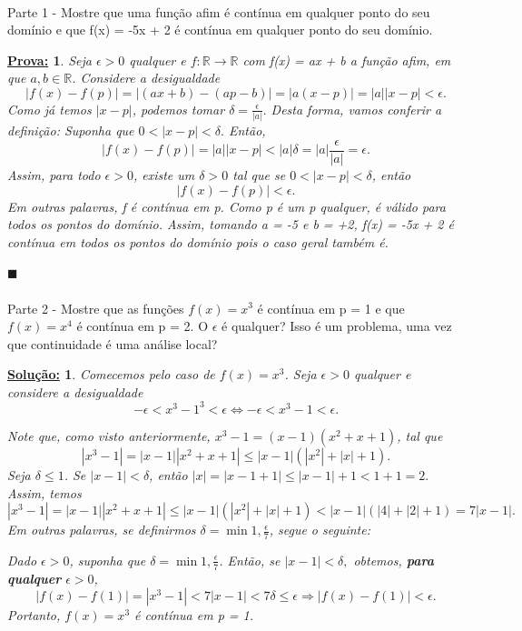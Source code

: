 \documentclass{article}
\newtheorem*{sol*}{\underline{Solu\c c\~ao:}}
\newtheorem*{proof*}{\underline{Prova:}}
\renewcommand\qedsymbol{$\blacksquare$}
\begin{document}
\paragraph{} Parte 1 - Mostre que uma fun\c c\~ao afim \'e cont\'inua em qualquer ponto do seu dom\'inio e que f(x) = -5x + 2 \'e cont\'inua em qualquer ponto do seu dom\'inio.
\begin{proof*}
Seja $\epsilon > 0$ qualquer e $f:\mathbb{R}\rightarrow\mathbb{R}$ com f(x) = ax + b a fun\c c\~ao afim, em que $a, b\in\mathbb{R}$. Considere a desigualdade 
$$
|f(x) - f(p)| = |(ax + b) - (ap - b)| = |a(x - p)| = |a||x - p|< \epsilon.
$$
Como j\'a temos $|x - p|$, podemos tomar $\delta = \frac{\epsilon}{|a|}.$ Desta forma, vamos conferir a defini\c c\~ao: Suponha que $0 < |x - p| < \delta.$ Ent\~ao, 
$$
|f(x) - f(p)| = |a||x - p| < |a|\delta = |a|\frac{\epsilon}{|a|} = \epsilon.
$$
Assim, para todo $\epsilon > 0$, existe um $\delta > 0$ tal que se $0 < |x - p| < \delta$, ent\~ao
$$
|f(x) - f(p)| < \epsilon.
$$
Em outras palavras, f \'e cont\'inua em p. Como p \'e um p qualquer, \'e v\'alido para todos os pontos do dom\'inio. Assim, tomando a = -5 e b = +2, f(x) = -5x + 2 \'e cont\'inua em todos os pontos do dom\'inio pois o caso geral tamb\'em \'e.

\qedsymbol
\end{proof*}

\paragraph{} Parte 2 - Mostre que as fun\c c\~oes $f(x) = x^3$ \'e cont\'inua em p = 1 e que $f(x) = x^4$ \'e cont\'inua em p = 2. O $\epsilon$ \'e qualquer? Isso \'e um problema, uma vez que continuidade \'e uma an\'alise local?
\begin{sol*}
Comecemos pelo caso de $f(x) = x^3$. Seja $\epsilon > 0$ qualquer e considere a desigualdade
$$
-\epsilon < x^3 - 1^3 < \epsilon \Leftrightarrow -\epsilon < x^3 - 1 < \epsilon.
$$

Note que, como visto anteriormente, $x^3 - 1 = (x - 1)(x^2 + x + 1)$, tal que
$$
|x^3 - 1| = |x - 1||x^2 + x + 1| \leq |x - 1|(|x^2| + |x| + 1).
$$
Seja $\delta \leq 1$. Se $|x - 1| < \delta$, ent\~ao $|x| = |x - 1 + 1| \leq |x - 1| + 1 < 1 + 1 = 2.$ Assim, temos
$$
|x^3 - 1| = |x - 1||x^2 + x + 1| \leq |x - 1|(|x^2| + |x| + 1) < |x-1|(|4| + |2| + 1) = 7|x - 1|.
$$
Em outras palavras, se definirmos $\delta = \min{1,\frac{\epsilon}{7}}$, segue o seguinte:

Dado $\epsilon > 0$, suponha que $\delta = \min{1, \frac{\epsilon}{7}}$. Ent\~ao, se $|x - 1| < \delta,$ obtemos, \textbf{para qualquer} $\epsilon > 0$,
$$
|f(x) - f(1)| = |x^3 - 1| < 7|x - 1| < 7\delta \leq \epsilon \Rightarrow |f(x) - f(1)| < \epsilon.
$$
Portanto, $f(x) = x^3$ \'e cont\'inua em p = 1.

\end{sol*}
\end{document}

